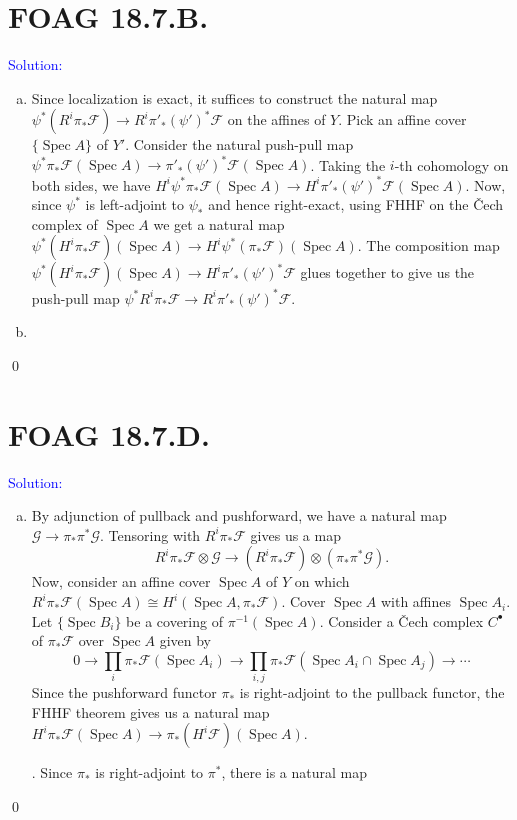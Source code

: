 \documentclass[11pt]{article}
\newcommand{\cG}{\mathcal{G}}
\newcommand{\cF}{\mathcal{F}}
\DeclareMathOperator{\Spec}{\operatorname{Spec}}
\newenvironment{solution}{\begin{trivlist}\item[]{\textcolor{blue}{Solution:}}}{\qed \end{trivlist}}
\begin{document}
\newpage

\section*{FOAG 18.7.B.}

\begin{solution}
\begin{enumerate}[(a)]
    \item Since localization is exact, it suffices to construct the natural map $\psi^* (R^i\pi_* \cF) \rightarrow R^i \pi'_* (\psi')^* \cF$ on the affines of $Y$. Pick an affine cover $\{\Spec A\}$ of $Y'$. Consider the natural push-pull map $\psi^* \pi_* \cF(\Spec A) \rightarrow \pi'_* (\psi')^* \cF(\Spec A)$. Taking the $i$-th cohomology on both sides, we have $H^i\psi^* \pi_* \cF(\Spec A) \rightarrow H^i \pi'_* (\psi')^* \cF(\Spec A)$. Now, since $\psi^*$ is left-adjoint to $\psi_*$ and hence right-exact, using FHHF on the \v Cech complex of $\Spec A$ we get a natural map $\psi^* (H^i \pi_* \cF)(\Spec A) \rightarrow H^i \psi^* (\pi_* \cF)(\Spec A)$. The composition map $\psi^* (H^i \pi_* \cF)(\Spec A) \rightarrow H^i \pi'_* (\psi')^* \cF$ glues together to give us the push-pull map $\psi^* R^i \pi_* \cF \rightarrow R^i \pi'_* (\psi')^* \cF$.

    \item 
    
\end{enumerate}
\end{solution}

\newpage

\section*{FOAG 18.7.D.}

\begin{solution}
\begin{enumerate}[(a)]
    \item By adjunction of pullback and pushforward, we have a natural map $\cG \rightarrow \pi_* \pi^* \cG$. Tensoring with $R^i \pi_* \cF$ gives us a map 
    \[
        R^i \pi_* \cF \otimes \cG \longrightarrow (R^i \pi_* \cF) \otimes (\pi_* \pi^* \cG).
    \]
    Now, consider an affine cover $\Spec A$ of $Y$ on which $R^i \pi_* \cF (\Spec A) \cong H^i (\Spec A, \pi_*\cF)$. Cover $\Spec A$ with affines $\Spec A_i$. Let $\{\Spec B_i\}$ be a covering of $\pi^{-1}(\Spec A)$. Consider a \v Cech complex $C^{\bullet}$ of $\pi_*\cF$ over $\Spec A$ given by 
    \[
        0 \longrightarrow \prod_i \pi_*\cF(\Spec A_i) \longrightarrow \prod_{i,j} \pi_*\cF(\Spec A_i \cap \Spec A_j) \longrightarrow \cdots
    \]
    Since the pushforward functor $\pi_*$ is right-adjoint to the pullback functor, the FHHF theorem gives us a natural map $H^i \pi_* \cF(\Spec A) \rightarrow \pi_* (H^i \cF)(\Spec A)$. 

    . Since $\pi_*$ is right-adjoint to $\pi^*$, there is a natural map 
\end{enumerate}
\end{solution}
\end{document}
